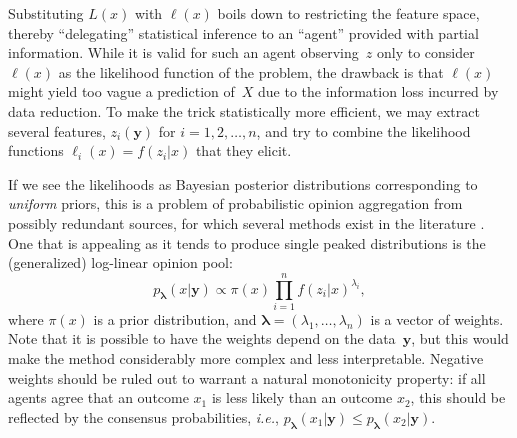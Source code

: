 \documentclass[english]{scrartcl}
\def\y{{\mathbf{y}}}
\newcommand{\blambda}{{\boldsymbol{\lambda}}}
\begin{document}
Substituting $L(x)$ with $\ell(x)$ boils down to restricting the feature space, thereby  ``delegating'' statistical inference to an ``agent'' provided with partial information. While it is valid for such an agent observing~$z$ only to consider $\ell(x)$ as the likelihood function of the problem, the drawback is that $\ell(x)$ might yield too vague a prediction of~$X$ due to the information loss incurred by data reduction. To make the trick statistically more efficient, we may extract several features, $z_i(\y)$ for $i=1,2,\ldots,n$, and try to combine the likelihood functions $\ell_i(x) = f(z_i|x)$ that they elicit.

If we see the likelihoods as Bayesian posterior distributions corresponding to {\em uniform} priors, this is a problem of probabilistic opinion aggregation from possibly redundant sources, for which several methods exist in the literature \cite{Tarantola-82,Genest-86,Garg-04,Allard-12}. One that is appealing as it tends to produce single peaked distributions is the (generalized) log-linear opinion pool:
\begin{equation}
\label{eq:log_pool}
p_\blambda(x|\y) \propto \pi(x) \prod_{i=1}^n f(z_i|x)^{\lambda_i},
\end{equation} 
where $\pi(x)$ is a prior distribution, and $\blambda=(\lambda_1,\ldots,\lambda_n)$ is a vector of weights. Note that it is possible to have the weights depend on the data~$\y$, but this would make the method considerably more complex and less interpretable. Negative weights should be ruled out to warrant a natural monotonicity property: if all agents agree that an outcome $x_1$ is less likely than an outcome $x_2$, this should be reflected by the consensus probabilities, {\em i.e.}, $p_\blambda(x_1|\y)\leq p_\blambda(x_2|\y)$. 



\end{document}
